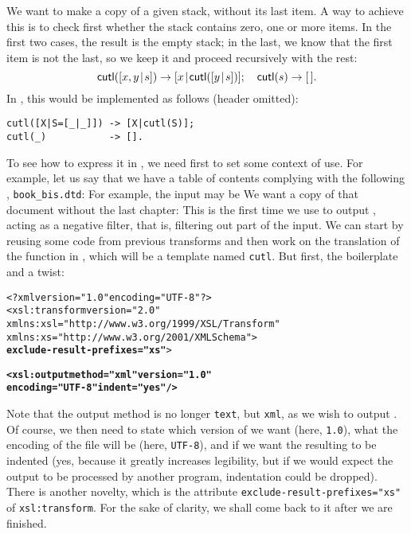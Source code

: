 We want to make a copy of a given stack, without its last item. A way
to achieve this is to check first whether the stack contains zero, one
or more items. In the first two cases, the result is the empty stack;
in the last, we know that the first item is not the last, so we keep
it and proceed recursively with the rest:
\begin{equation*}
\textsf{cutl}([{x,y}\!\mid\!{s}]) \rightarrow [{x}\!\mid\!{\textsf{cutl}([{y}\!\mid\!{s}])}];\quad
\textsf{cutl}(s) \rightarrow [\,].
\end{equation*}
In \Erlang, this would be implemented as follows (header omitted):
\begin{verbatim}
cutl([X|S=[_|_]]) -> [X|cutl(S)];
cutl(_)           -> [].
\end{verbatim}
To see how to express it in \XSLT, we need first to set some context
of use. For example, let us say that we have a table of contents
complying with the following \DTD, \texttt{book\_bis.dtd}:
\noindent For example, the input may be
\noindent We want a copy of that \XML document without the last
chapter:
\noindent This is the first time we use \XSLT to output \XML, acting
as a negative filter, that is, filtering out part of the input. We can
start by reusing some code from previous transforms and then work on
the translation of the function  in \XSLT, which will be a
template named \texttt{cutl}. But first, the boilerplate and a twist:
\begin{alltt}
<?xml version="1.0" encoding="UTF-8"?>
<xsl:transform version="2.0"
               xmlns:xsl="http://www.w3.org/1999/XSL/Transform"
               xmlns:xs="http://www.w3.org/2001/XMLSchema">
               \textbf{exclude-result-prefixes="xs"}>

  \textbf{<xsl:output method="xml" version="1.0"
              encoding="UTF-8" indent="yes"/>}
\end{alltt}
Note that the output method is no longer \texttt{text}, but
\texttt{xml}, as we wish to output \XML. Of course, we then need to
state which version of \XML we want (here, \texttt{1.0}), what the
encoding of the file will be (here, \texttt{UTF-8}), and if we want
the resulting \XML to be indented (yes, because it greatly increases
legibility, but if we would expect the output to be processed by
another \XSLT program, indentation could be dropped). There is another
novelty, which is the attribute \texttt{exclude-result-prefixes="xs"}
of \texttt{xsl:transform}. For the sake of clarity, we shall come back
to it after we are finished.

